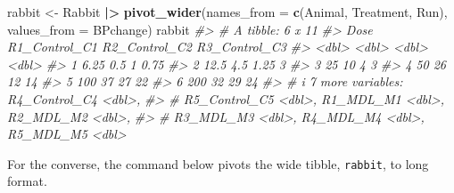 \documentclass[
]{book}
\newenvironment{Shaded}{\begin{snugshade}}{\end{snugshade}}
\newcommand{\AttributeTok}[1]{\textcolor[rgb]{0.13,0.29,0.53}{#1}}
\newcommand{\CommentTok}[1]{\textcolor[rgb]{0.56,0.35,0.01}{\textit{#1}}}
\newcommand{\FunctionTok}[1]{\textcolor[rgb]{0.13,0.29,0.53}{\textbf{#1}}}
\newcommand{\NormalTok}[1]{#1}
\newcommand{\OtherTok}[1]{\textcolor[rgb]{0.56,0.35,0.01}{#1}}
\newcommand{\SpecialCharTok}[1]{\textcolor[rgb]{0.81,0.36,0.00}{\textbf{#1}}}
\begin{document}
\begin{Shaded}
\begin{Highlighting}[]
\NormalTok{rabbit }\OtherTok{\textless{}{-}}\NormalTok{ Rabbit }\SpecialCharTok{|\textgreater{}} 
  \FunctionTok{pivot\_wider}\NormalTok{(}\AttributeTok{names\_from =} \FunctionTok{c}\NormalTok{(Animal, Treatment, Run), }\AttributeTok{values\_from =}\NormalTok{ BPchange)}
\NormalTok{rabbit}
\CommentTok{\#\textgreater{} \# A tibble: 6 x 11}
\CommentTok{\#\textgreater{}     Dose R1\_Control\_C1 R2\_Control\_C2 R3\_Control\_C3}
\CommentTok{\#\textgreater{}    \textless{}dbl\textgreater{}         \textless{}dbl\textgreater{}         \textless{}dbl\textgreater{}         \textless{}dbl\textgreater{}}
\CommentTok{\#\textgreater{} 1   6.25           0.5          1             0.75}
\CommentTok{\#\textgreater{} 2  12.5            4.5          1.25          3   }
\CommentTok{\#\textgreater{} 3  25             10            4             3   }
\CommentTok{\#\textgreater{} 4  50             26           12            14   }
\CommentTok{\#\textgreater{} 5 100             37           27            22   }
\CommentTok{\#\textgreater{} 6 200             32           29            24   }
\CommentTok{\#\textgreater{} \# i 7 more variables: R4\_Control\_C4 \textless{}dbl\textgreater{},}
\CommentTok{\#\textgreater{} \#   R5\_Control\_C5 \textless{}dbl\textgreater{}, R1\_MDL\_M1 \textless{}dbl\textgreater{}, R2\_MDL\_M2 \textless{}dbl\textgreater{},}
\CommentTok{\#\textgreater{} \#   R3\_MDL\_M3 \textless{}dbl\textgreater{}, R4\_MDL\_M4 \textless{}dbl\textgreater{}, R5\_MDL\_M5 \textless{}dbl\textgreater{}}
\end{Highlighting}
\end{Shaded}

For the converse, the command below pivots the wide tibble, \texttt{rabbit}, to long format.
\end{document}
